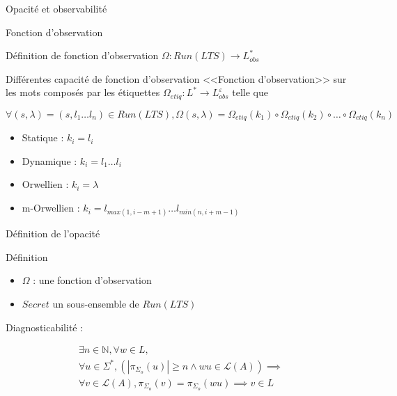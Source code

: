 \documentclass[11pt]{beamer}
\begin{document}
\begin{section}{Opacit\'e et observabilit\'e}
  \begin{frame}{Fonction d'observation}
    \begin{block}{D\'efinition de fonction d'observation}
      $\Omega : Run(LTS) \rightarrow L_{obs}^*$
    \end{block}
    
    \begin{block}{Diff\'erentes capacit\'e de fonction d'observation}
     <<Fonction d'observation>> sur les mots compos\'es par les \'etiquettes $\Omega_{etiq} : L^* \rightarrow L_{obs}^{\varepsilon}$ telle que 
	
	$\forall (s,\lambda)= (s,l_1\dots l_n) \in Run(LTS), \Omega(s,\lambda) = \Omega_{etiq}(k_1)\circ\Omega_{etiq}(k_2)\circ\dots\circ\Omega_{etiq}(k_n)$

      \begin{itemize}
        \item Statique : $k_i = l_i$
	\item Dynamique : $k_i = l_1 \dots l_i$
	\item Orwellien : $k_i = \lambda$
	\item m-Orwellien : $k_i = l_{max(1,i-m+1)} \dots l_{min(n,i+m-1)}$

      \end{itemize}
    \end{block}   
   
  \end{frame}
  
  \begin{frame}{D\'efinition de l'opacit\'e}
    \begin{block}{D\'efinition}
      \begin{itemize}
       \item $\Omega$ : une fonction d'observation 
       \item $Secret$ un sous-ensemble de $Run(LTS)$
      \end{itemize}

      Diagnosticabilité :
      
      $$\begin{array}{l}
	    \exists n \in \mathbb N, \forall w \in L,\\
	    \forall u \in \Sigma^*, \left(\left|\pi_{\Sigma_o}(u)\right|\ge n \land wu \in \mathcal L(A)\right) \implies\\
	    \forall v \in \mathcal L(A), \pi_{\Sigma_o}(v)=\pi_{\Sigma_o}(wu) \implies v \in L
	     \end{array}$$ 
      

\end{block}
\end{frame}
\end{section}
\end{document}
